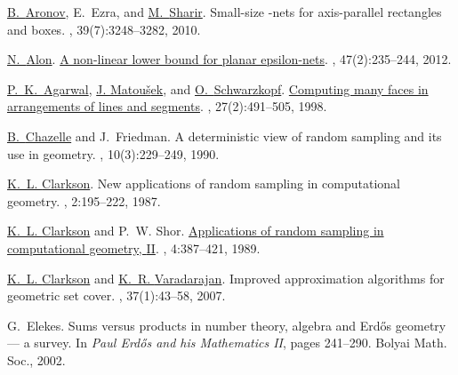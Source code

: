 \documentclass[12pt]{article}
\providecommand{\Erdos}{Erd{\H{o}}s\xspace}
\begin{document}
\providecommand{\Erdos}{Erd{\H o}s\xspace}
\begin{thebibliography}{MSW90}

\href{http://cis.poly.edu/~aronov/}{B.~{Aronov}}, E.~Ezra, and \href{http://www.math.tau.ac.il/~michas}{M.~{Sharir}}.
\newblock  Small-size -nets for axis-parallel rectangles and
  boxes.
, 39(7):3248--3282, 2010.

\href{http://www.math.tau.ac.il/~nogaa/}{N.~{Alon}}.
\newblock \href{http://dx.doi.org/10.1007/s00454-010-9323-7}{A non-linear lower
  bound for planar epsilon-nets}.
, 47(2):235--244, 2012.

\href{http://www.cs.duke.edu/~pankaj}{P.~K.~{Agarwal}}, \href{http://kam.mff.cuni.cz/~matousek}{J. Matou{\v s}ek}, and \href{http://www.win.tue.nl/~ocheong/}{O.~{Schwarzkopf}}.
\newblock \href{http://epubs.siam.org/sam-bin/dbq/article/26616}{Computing many
  faces in arrangements of lines and segments}.
, 27(2):491--505, 1998.

\href{http://www.cs.princeton.edu/~chazelle/}{B.~{Chazelle}} and J.~Friedman.
\newblock  A deterministic view of random sampling and its use in geometry.
, 10(3):229--249, 1990.

\href{http://cm.bell-labs.com/who/clarkson/}{K.~L. {Clarkson}}.
\newblock  New applications of random sampling in computational geometry.
, 2:195--222, 1987.

\href{http://cm.bell-labs.com/who/clarkson/}{K.~L. {Clarkson}} and P.~W. Shor.
\newblock \href{http://cm.bell-labs.com/who/clarkson/rs2m.html}{Applications of
  random sampling in computational geometry, {II}}.
, 4:387--421, 1989.

\href{http://cm.bell-labs.com/who/clarkson/}{K.~L. {Clarkson}} and \href{http://www.cs.uiowa.edu/~kvaradar/}{K.~R. {Varadarajan}}.
\newblock  Improved approximation algorithms for geometric set cover.
, 37(1):43--58, 2007.

G.~Elekes.
\newblock  Sums versus products in number theory, algebra and {\Erdos{}}
  geometry --- a survey.
\newblock In {\em Paul {\Erdos{}} and his Mathematics II}, pages 241--290.
  Bolyai Math. Soc., 2002.


\end{thebibliography}
\end{document}
